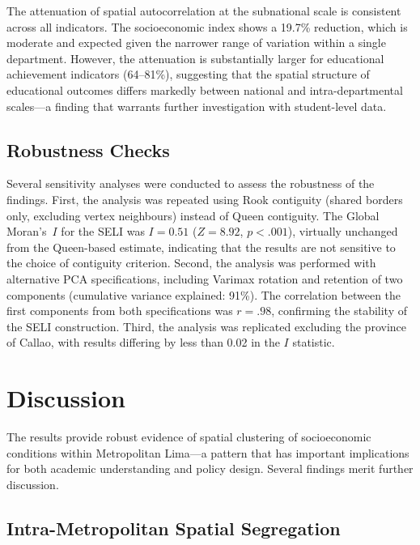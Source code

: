 \documentclass[12pt,a4paper,twoside]{article}
\begin{document}
The attenuation of spatial autocorrelation at the subnational scale is consistent
across all indicators. The socioeconomic index shows a 19.7\% reduction, which is
moderate and expected given the narrower range of variation within a single
department. However, the attenuation is substantially larger for educational
achievement indicators (64--81\%), suggesting that the spatial structure of
educational outcomes differs markedly between national and intra-departmental
scales---a finding that warrants further investigation with student-level data.

\subsection{Robustness Checks}

Several sensitivity analyses were conducted to assess the robustness of the
findings. First, the analysis was repeated using Rook contiguity (shared borders
only, excluding vertex neighbours) instead of Queen contiguity. The Global
Moran's~$I$ for the SELI was $I = 0.51$ ($Z = 8.92$, $p < .001$), virtually
unchanged from the Queen-based estimate, indicating that the results are not
sensitive to the choice of contiguity criterion. Second, the analysis was
performed with alternative PCA specifications, including Varimax rotation and
retention of two components (cumulative variance explained: 91\%). The
correlation between the first components from both specifications was $r = .98$,
confirming the stability of the SELI construction. Third, the analysis was
replicated excluding the province of Callao, with results differing by less
than 0.02 in the $I$ statistic.

\section{Discussion}

The results provide robust evidence of spatial clustering of socioeconomic
conditions within Metropolitan Lima---a pattern that has important implications
for both academic understanding and policy design. Several findings merit
further discussion.

\subsection{Intra-Metropolitan Spatial Segregation}
\end{document}
